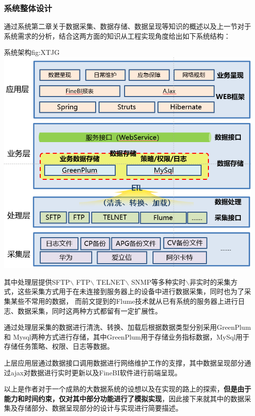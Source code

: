\documentclass{HustGraduPaper}
\begin{document}
    \subsubsection{系统整体设计}
    通过系统第二章关于数据采集、数据存储、数据呈现等知识的概述以及上一节对于系统需求的分析，结合这两方面的知识从工程实现角度给出如下系统结构：
    \clearpage
    \begin{generalfig}{系统架构}{fig:XTJG} 
        \includegraphics[scale = 0.7]{Figures/XTJG.png} 
    \end{generalfig}
    
    其中处理层提供SFTP$\backslash$ FTP$\backslash$ TELNET$\backslash$ SNMP等多种实时$\backslash$非实时的采集方式，这些采集方式用于在未连接到服务器上的设备中进行数据采集，同时也为了采集某些不常用的数据，
    而前文提到的Flume技术就从已有系统的服务器上进行日志、数据采集，同时这两种方式都留有一定扩展性。

    通过处理层采集的数据进行清洗、转换、加载后根据数据类型分别采用GreenPlum 和 Mysql两种方式进行存储，其中GreenPlum用于存储业务指标数据，MySql用于存储任务策略、权限、日志等数据。

    上层应用层通过数据接口调用数据进行网络维护工作的支撑，其中数据呈现部分通过ajax对数据进行实时更新以及FineBI软件进行前端呈现。

    以上是作者对于一个成熟的大数据系统的设想以及在实现的路上的探索，{\songti \bfseries 但是由于能力和时间约束，仅对其中部分功能进行了模拟实现}，因此接下来就其中的数据采集及存储部分、数据呈现部分的设计与实现进行简要描述。
\end{document}
